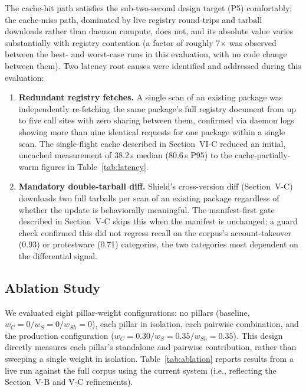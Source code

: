 \documentclass[journal]{IEEEtran}
\begin{document}
The cache-hit path satisfies the sub-two-second design target (P5) comfortably; the cache-miss path,
dominated by live registry round-trips and tarball downloads rather than daemon compute, does not, and its
absolute value varies substantially with registry contention (a factor of roughly 7$\times$ was observed
between the best- and worst-case runs in this evaluation, with no code change between them). Two latency
root causes were identified and addressed during this evaluation:

\begin{enumerate}
\item \textbf{Redundant registry fetches.} A single scan of an existing package was independently
re-fetching the same package's full registry document from up to five call sites with zero sharing between
them, confirmed via daemon logs showing more than nine identical requests for one package within a single
scan. The single-flight cache described in Section~VI-C reduced an initial, uncached measurement of 38.2\,s
median (80.6\,s P95) to the cache-partially-warm figures in Table~\ref{tab:latency}.
\item \textbf{Mandatory double-tarball diff.} Shield's cross-version diff (Section~V-C) downloads two full
tarballs per scan of an existing package regardless of whether the update is behaviorally meaningful. The
manifest-first gate described in Section~V-C skips this when the manifest is unchanged; a guard check
confirmed this did not regress recall on the corpus's account-takeover (0.93) or protestware (0.71)
categories, the two categories most dependent on the differential signal.
\end{enumerate}

\subsection{Ablation Study}
\label{sec:ablation}
We evaluated eight pillar-weight configurations: no pillars (baseline, $w_C{=}0/w_S{=}0/w_{Sh}{=}0$), each
pillar in isolation, each pairwise combination, and the production configuration
($w_C{=}0.30/w_S{=}0.35/w_{Sh}{=}0.35$). This design directly measures each pillar's standalone and
pairwise contribution, rather than sweeping a single weight in isolation. Table~\ref{tab:ablation} reports
results from a live run against the full corpus using the current system (i.e., reflecting the Section~V-B
and V-C refinements).
\end{document}
